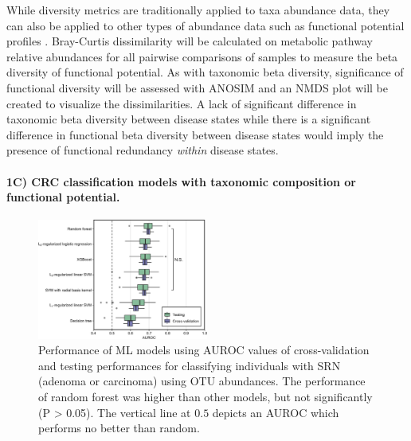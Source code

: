 \documentclass[11pt]{article}
\begin{document}
While diversity metrics are traditionally applied to taxa abundance data,
they can also be applied to other types of abundance data such as functional potential profiles \cite{franzosa_species-level_2018}.
Bray-Curtis dissimilarity will be calculated on metabolic pathway relative abundances for all pairwise comparisons of samples to measure the beta diversity of functional potential.
As with taxonomic beta diversity, significance of functional diversity will be assessed with ANOSIM and an NMDS plot will be created to visualize the dissimilarities.
A lack of significant difference in taxonomic beta diversity between disease states
while there is a significant difference in functional beta diversity between disease states
would imply the presence of functional redundancy \textit{within} disease states.

\paragraph{1C) CRC classification models with taxonomic composition or functional potential.}

\begin{figure}
    \vspace{-20pt}
    \begin{center}
        \includegraphics[width=0.5\textwidth]{figures/topcuoglu_f2.jpg}
        \caption{Performance of ML models using AUROC values of cross-validation and testing performances for classifying individuals with SRN (adenoma or carcinoma) using OTU abundances. The performance of random forest was higher than other models, but not significantly (P > 0.05). The vertical line at $0.5$ depicts an AUROC which performs no better than random. \cite{topcuoglu_framework_2020}}
        \label{fig:rf}
    \end{center}
    \vspace{-20pt}
\end{figure}
\end{document}
